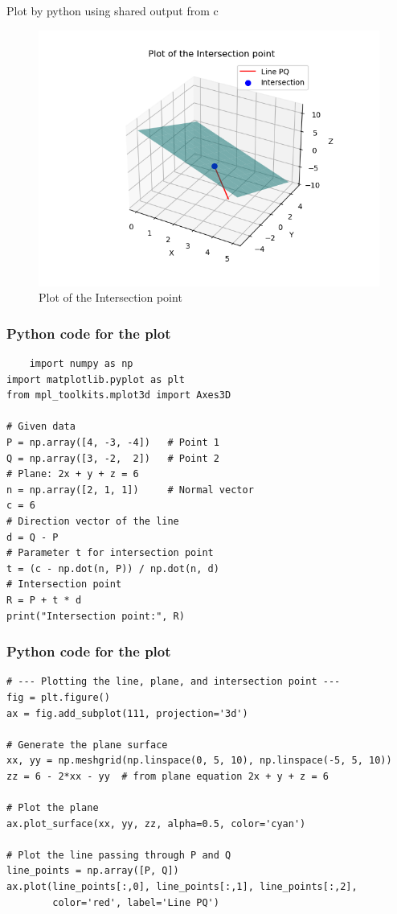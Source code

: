 \documentclass{beamer}
\begin{document}
\begin{frame}{Plot by python using shared output from c}
	\begin{center}
	\begin{figure}[H]
		\centering
		\includegraphics[width = 0.7\columnwidth]{figs/fig1.png}
		\caption{Plot of the Intersection point}
		\label{fig1}
	\end{figure}
	\end{center}
\end{frame}
\begin{frame}[fragile]
     \frametitle{Python code for the plot}
\begin{lstlisting}
    import numpy as np
import matplotlib.pyplot as plt
from mpl_toolkits.mplot3d import Axes3D

# Given data
P = np.array([4, -3, -4])   # Point 1
Q = np.array([3, -2,  2])   # Point 2
# Plane: 2x + y + z = 6
n = np.array([2, 1, 1])     # Normal vector
c = 6
# Direction vector of the line
d = Q - P
# Parameter t for intersection point
t = (c - np.dot(n, P)) / np.dot(n, d)
# Intersection point
R = P + t * d
print("Intersection point:", R)
\end{lstlisting}
\end{frame}
\begin{frame}[fragile]
   \frametitle{Python code for the plot}
    \begin{lstlisting}
# --- Plotting the line, plane, and intersection point ---
fig = plt.figure()
ax = fig.add_subplot(111, projection='3d')

# Generate the plane surface
xx, yy = np.meshgrid(np.linspace(0, 5, 10), np.linspace(-5, 5, 10))
zz = 6 - 2*xx - yy  # from plane equation 2x + y + z = 6

# Plot the plane
ax.plot_surface(xx, yy, zz, alpha=0.5, color='cyan')

# Plot the line passing through P and Q
line_points = np.array([P, Q])
ax.plot(line_points[:,0], line_points[:,1], line_points[:,2],
        color='red', label='Line PQ')
 \end{lstlisting}
\end{frame}
\end{document}
